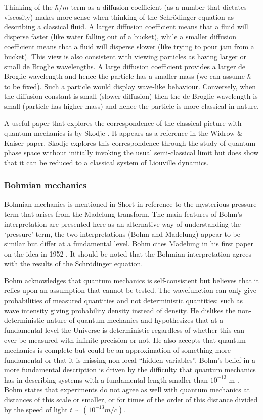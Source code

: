 Thinking of the $\hbar /m$ term as a diffusion coefficient (as a number that dictates viscosity) makes more sense when thinking of the Schr\"odinger equation as describing a classical fluid. A larger diffusion coefficient means that a fluid will disperse faster (like water falling out of a bucket), while a smaller diffusion coefficient means that a fluid will disperse slower (like trying to pour jam from a bucket). This view is also consistent with viewing particles as having larger or small de Broglie wavelengths. A large diffusion coefficient provides a larger de Broglie wavelength and hence the particle has a smaller mass (we can assume $\hbar$ to be fixed). Such a particle would display wave-like behaviour. Conversely, when the diffusion constant is small (slower diffusion) then the de Broglie wavelength is small (particle has higher mass) and hence the particle is more classical in nature.

A useful paper that explores the correspondence of the classical picture with quantum mechanics is by Skodje \citep{bib_skod}. It appears as a reference in the Widrow \& Kaiser paper. Skodje explores this correspondence through the study of quantum phase space without initially invoking the usual semi-classical limit but does show that it can be reduced to a classical system of Liouville dynamics.

\subsubsection{Bohmian mechanics}
\label{bohm_mech}
Bohmian mechanics is mentioned in Short \citep{bib_short} in reference to the mysterious pressure term that arises from the Madelung transform. The main features of Bohm's interpretation are presented here as an alternative way of understanding the `pressure' term, the two interpretations (Bohm and Madelung) appear to be similar but differ at a fundamental level. Bohm cites Madelung in his first paper on the idea in 1952 \citep{bib_bohm, bib_bohm2}. It should be noted that the Bohmian interpretation agrees with the results of the Schr\"odinger equation.

Bohm acknowledges that quantum mechanics is self-consistent but believes that it relies upon an assumption that cannot be tested. The wavefunction can only give probabilities of measured quantities and not deterministic quantities: such as wave intensity giving probability density instead of density. He dislikes the non-deterministic nature of quantum mechanics and hypothesizes that at a fundamental level the Universe is deterministic regardless of whether this can ever be measured with infinite precision or not. He also accepts that quantum mechanics is complete but could be an approximation of something more fundamental or that it is missing non-local ``hidden variables''. Bohm's belief in a more fundamental description is driven by the difficulty that quantum mechanics has in describing systems with a fundamental length smaller than $10^{-13}$ m \citep{bib_bohm, bib_bohm2}.
Bohm states that experiments do not agree as well with quantum mechanics at distances of this scale or smaller, or for times of the order of this distance divided by the speed of light $t\sim (10^{-13} m/ c)$.

